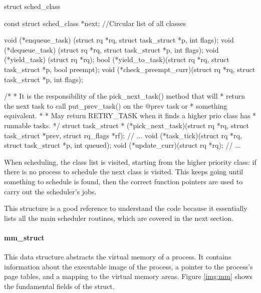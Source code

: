 \begin{code}
struct sched_class {
	const struct sched_class *next; //Circular list of all classes

	void (*enqueue_task) (struct rq *rq, struct task_struct *p, int flags);
	void (*dequeue_task) (struct rq *rq, struct task_struct *p, int flags);
	void (*yield_task)   (struct rq *rq);
	bool (*yield_to_task)(struct rq *rq, struct task_struct *p, bool preempt);
	void (*check_preempt_curr)(struct rq *rq, struct task_struct *p, int flags);

	/*
	 * It is the responsibility of the pick_next_task() method that will
	 * return the next task to call put_prev_task() on the @prev task or
	 * something equivalent.
	 *
	 * May return RETRY_TASK when it finds a higher prio class has 
	 * runnable tasks.
	 */
	struct task_struct * (*pick_next_task)(struct rq *rq,
					       struct task_struct *prev,
					       struct rq_flags *rf);
    // ...
    void (*task_tick)(struct rq *rq, struct task_struct *p, int queued);
    void (*update_curr)(struct rq *rq);
    // ...
}
\end{code}
When scheduling, the class list is visited, starting from the higher priority class: if there is no process to schedule the next class is visited. This keeps going until something to schedule is found, then the correct function pointers are used to carry out the scheduler's jobs. 

This structure is a good reference to understand the code because it essentially lists all the main scheduler routines, which are covered in the next section.

\paragraph{mm\_struct} 
This data structure abstracts the virtual memory of a process. It contains information about the executable image of the process, a pointer to the process's page tables, and a mapping to the virtual memory areas. Figure \ref{img:mm} shows the fundamental fields of the struct.


